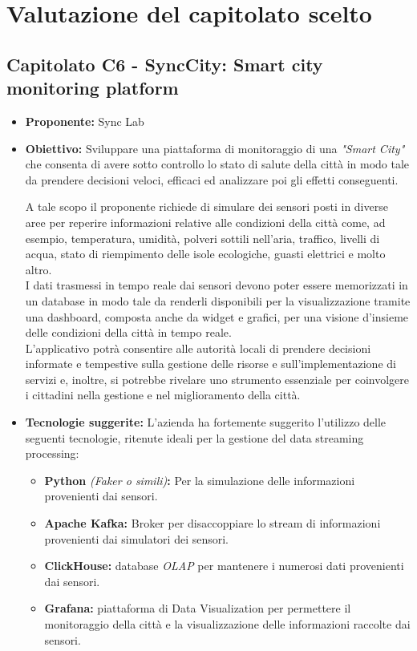 \documentclass{article}
\begin{document}

\section{Valutazione del capitolato scelto}

\subsection{\textbf{Capitolato C6} - SyncCity: Smart city monitoring platform}
\begin{itemize}
    \item[] \textbf{Proponente:} Sync Lab
    
    \item[] \textbf{Obiettivo:} Sviluppare una piattaforma di monitoraggio di una \textit{"Smart City"} che consenta di avere sotto controllo lo stato di salute della città in modo tale da prendere decisioni veloci, efficaci ed analizzare poi gli effetti conseguenti.  
    
    A tale scopo il proponente richiede di simulare dei sensori posti in diverse aree per reperire informazioni relative alle condizioni della città come, ad esempio, temperatura, umidità, polveri sottili nell'aria, traffico, livelli di acqua, stato di riempimento delle isole ecologiche, guasti elettrici e molto altro.\\
    I dati trasmessi in tempo reale dai sensori devono poter essere memorizzati in un database in modo tale da renderli disponibili per la visualizzazione tramite una dashboard, composta anche da widget e grafici, per una visione d'insieme delle condizioni della città in tempo reale.\\
    L'applicativo potrà consentire alle autorità locali di prendere decisioni informate e tempestive sulla gestione delle risorse e sull'implementazione di servizi e, inoltre, si potrebbe rivelare uno strumento essenziale per coinvolgere i cittadini nella gestione e nel miglioramento della città. 
    
    \item[] \textbf{Tecnologie suggerite:} L’azienda ha fortemente suggerito l’utilizzo delle seguenti tecnologie, ritenute ideali per la gestione del data streaming processing: 
    \begin{itemize}
        \item \textbf{Python} \textit{(Faker o simili)}\textbf{:} Per la simulazione delle informazioni provenienti dai sensori.  
        \item \textbf{Apache Kafka:} Broker per disaccoppiare lo stream di informazioni provenienti dai simulatori dei sensori. 
        \item \textbf{ClickHouse:} database \textit{OLAP} per mantenere i numerosi dati provenienti dai sensori. 
        \item \textbf{Grafana:} piattaforma di Data Visualization per permettere il monitoraggio della città e la visualizzazione delle informazioni raccolte dai sensori. 
    \end{itemize}
    

\end{itemize}
\end{document}
